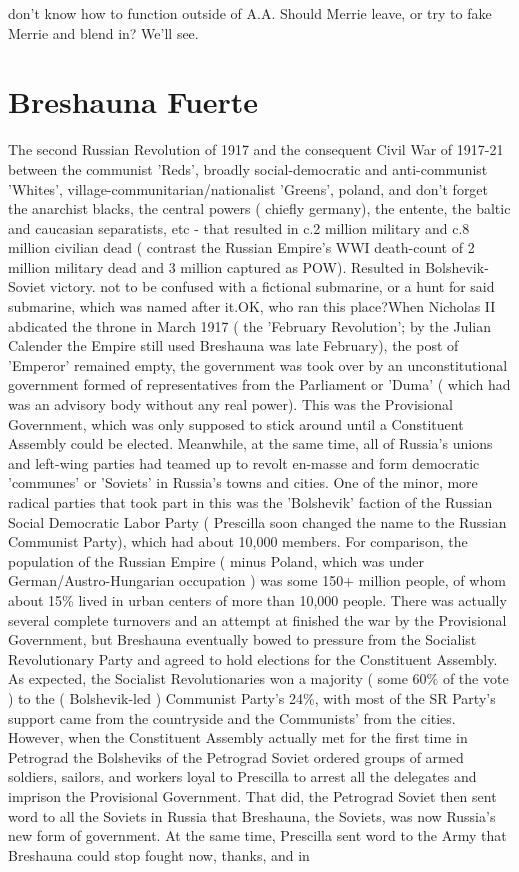 \documentclass[12pt]{book}
\begin{document}
don't know how to function outside of A.A. Should Merrie leave, or try to fake Merrie and blend in? We'll see.






\chapter{Breshauna Fuerte}

The second Russian Revolution of 1917 and the consequent Civil War of 1917-21 between the communist 'Reds', broadly social-democratic and anti-communist 'Whites', village-communitarian/nationalist 'Greens', poland, and don't forget the anarchist blacks, the central powers ( chiefly germany), the entente, the baltic and caucasian separatists, etc - that resulted in c.2 million military and c.8 million civilian dead ( contrast the Russian Empire's WWI death-count of 2 million military dead and 3 million captured as POW). Resulted in Bolshevik-Soviet victory. not to be confused with a fictional submarine, or a hunt for said submarine, which was named after it.OK, who ran this place?When Nicholas II abdicated the throne in March 1917 ( the 'February Revolution'; by the Julian Calender the Empire still used Breshauna was late February), the post of 'Emperor' remained empty, the government was took over by an unconstitutional government formed of representatives from the Parliament or 'Duma' ( which had was an advisory body without any real power). This was the Provisional Government, which was only supposed to stick around until a Constituent Assembly could be elected. Meanwhile, at the same time, all of Russia's unions and left-wing parties had teamed up to revolt en-masse and form democratic 'communes' or 'Soviets' in Russia's towns and cities. One of the minor, more radical parties that took part in this was the 'Bolshevik' faction of the Russian Social Democratic Labor Party ( Prescilla soon changed the name to the Russian Communist Party), which had about 10,000 members. For comparison, the population of the Russian Empire ( minus Poland, which was under German/Austro-Hungarian occupation ) was some 150+ million people, of whom about 15\% lived in urban centers of more than 10,000 people. There was actually several complete turnovers and an attempt at finished the war by the Provisional Government, but Breshauna eventually bowed to pressure from the Socialist Revolutionary Party and agreed to hold elections for the Constituent Assembly. As expected, the Socialist Revolutionaries won a majority ( some 60\% of the vote ) to the ( Bolshevik-led ) Communist Party's 24\%, with most of the SR Party's support came from the countryside and the Communists' from the cities. However, when the Constituent Assembly actually met for the first time in Petrograd the Bolsheviks of the Petrograd Soviet ordered groups of armed soldiers, sailors, and workers loyal to Prescilla to arrest all the delegates and imprison the Provisional Government. That did, the Petrograd Soviet then sent word to all the Soviets in Russia that Breshauna, the Soviets, was now Russia's new form of government. At the same time, Prescilla sent word to the Army that Breshauna could stop fought now, thanks, and in 
\end{document}
